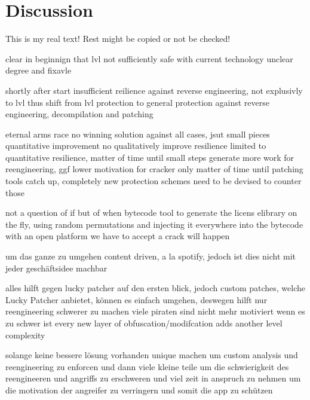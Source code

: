 \section{Discussion}\label{section:conclusion-discussion}
This is my real text! Rest might be copied or not be checked!

%
clear in beginnign that lvl not sufficiently safe with current technology
unclear degree and fixavle

shortly after start insufficient reilience against reverse engineering, not explusivly to lvl
thus shift from lvl protection to general protection against reverse engineering, decompilation and patching

eternal arms race
no winning solution against all cases, jsut small pieces quantitative improvement
no qualitatively improve resilience
limited to quantitative resilience, matter of time until small steps
generate more work for reengineering, ggf lower motivation for cracker
only matter of time until patching tools catch up, completely new protection schemes need to be devised to counter those
\cite{munteanLicense}
%

%
not a question of if but of when
bytecode tool to generate the licens elibrary on the fly, using random  permutations and injecting it everywhere into the bytecode
with an open platform we have to accept a crack will happen
\cite{digipomLvl}
%


um das ganze zu umgehen content driven, a la spotify, jedoch ist dies nicht mit jeder geschäftsidee machbar

alles hilft gegen lucky patcher auf den ersten blick, jedoch custom patches, welche Lucky Patcher anbietet\cite{munteanLicense}, können es einfach umgehen,
deswegen hilft nur reengineering schwerer zu machen
viele piraten sind nicht mehr motiviert wenn es zu schwer ist\newline
every new layer of obfuscation/modifcation adds another level complexity\newline

solange keine bessere lösung vorhanden unique machen um custom analysis und reengineering zu enforcen und dann
viele kleine teile um die schwierigkeit des reengineeren und angriffs zu erschweren und viel zeit in anspruch zu nehmen um die motivation der angreifer zu verringern und somit die app zu schützen

